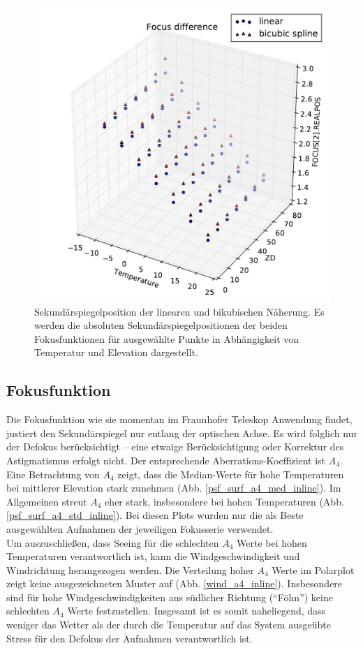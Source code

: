 \begin{figure}[H]
	\centering
	\includegraphics[scale=.6]{diff.pdf}
	\caption[Sekundärspiegelposition der linearen und bikubischen Näherung]{Sekundärspiegelposition der linearen und bikubischen Näherung. Es werden die absoluten Sekundärspiegelpositionen der beiden Fokusfunktionen für ausgewählte Punkte in Abhängigkeit von Temperatur und Elevation dargestellt.}
    \label{focus_surf}
\end{figure}

\subsection{Fokusfunktion}
Die Fokusfunktion wie sie momentan im Fraunhofer Teleskop Anwendung findet, justiert den Sekundärspiegel nur entlang der optischen Achse. Es wird folglich nur der Defokus berücksichtigt -- eine etwaige Berücksichtigung oder Korrektur des Astigmatismus erfolgt nicht. Der entsprechende Aberrations-Koeffizient ist $A_4$.\\
Eine Betrachtung von $A_4$ zeigt, dass die Median-Werte für hohe Temperaturen bei mittlerer Elevation stark zunehmen (Abb. \ref{psf_surf_a4_med_inline}). Im Allgemeinen streut $A_4$ eher stark, insbesondere bei hohen Temperaturen (Abb. \ref{psf_surf_a4_std_inline}). Bei diesen Plots wurden nur die als Beste ausgewählten Aufnahmen der jeweiligen Fokusserie verwendet.\\
Um auszuschließen, dass Seeing für die schlechten $A_4$ Werte bei hohen Temperaturen verantwortlich ist, kann die Windgeschwindigkeit und Windrichtung herangezogen werden. Die Verteilung hoher $A_4$ Werte im Polarplot zeigt keine ausgezeichneten Muster auf (Abb. \ref{wind_a4_inline}). Insbesondere sind für hohe Windgeschwindigkeiten aus südlicher Richtung (\enquote{Föhn}) keine schlechten $A_4$ Werte festzustellen. Insgesamt ist es somit naheliegend, dass weniger das Wetter als der durch die Temperatur auf das System ausgeübte Stress für den Defokus der Aufnahmen verantwortlich ist.\\

